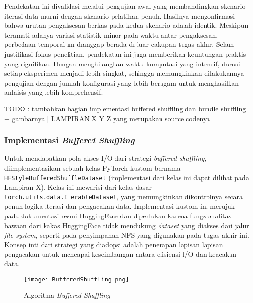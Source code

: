 Pendekatan ini divalidasi melalui pengujian awal yang membandingkan skenario iterasi data murni dengan skenario pelatihan penuh. Hasilnya mengonfirmasi bahwa urutan pengaksesan berkas pada kedua skenario adalah identik. Meskipun teramati adanya variasi statistik minor pada waktu antar-pengaksesan, perbedaan temporal ini dianggap berada di luar cakupan tugas akhir. Selain justifikasi fokus penelitian, pendekatan ini juga memberikan keuntungan praktis yang signifikan. Dengan menghilangkan waktu komputasi yang intensif, durasi setiap eksperimen menjadi lebih singkat, sehingga memungkinkan dilakukannya pengujian dengan jumlah konfigurasi yang lebih beragam untuk menghasilkan anlaisis yang lebih komprehensif.

TODO : tambahkan bagian implementasi buffered shuffling dan bundle shuffling + gambarnya | LAMPIRAN X Y Z yang merupakan source codenya
\subsubsection{Implementasi \textit{Buffered Shuffling}}
\begin{sloppypar}
Untuk mendapatkan pola akses I/O dari strategi \textit{buffered shuffling}, diimplementasikan sebuah kelas PyTorch kustom bernama \texttt{HFStyleBufferedShuffleDataset} (implementasi dari kelas ini dapat dilihat pada Lampiran X). Kelas ini mewarisi dari kelas dasar \texttt{torch.utils.data.IterableDataset}, yang memungkinkan dikontrolnya secara penuh logika iterasi dan pengacakan data. Implementasi kustom ini merujuk pada dokumentasi resmi HuggingFace \parencite{HuggingFaceIterableDataset} dan diperlukan karena fungsionalitas bawaan dari kakas HuggingFace tidak mendukung \textit{dataset} yang diakses dari jalur \textit{file system}, seperti pada penyimpanan NFS yang digunakan pada tugas akhir ini. Konsep inti dari strategi yang diadopsi adalah penerapan lapisan lapisan pengacakan untuk mencapai keseimbangan antara efisiensi I/O dan keacakan data.
\end{sloppypar}

\begin{figure}[t]
    \centering
    \texttt{[image: BufferedShuffling.png]}
    \caption{Algoritma \textit{Buffered Shuffling}}
    \label{fig:BufferedShuffling}
\end{figure}

